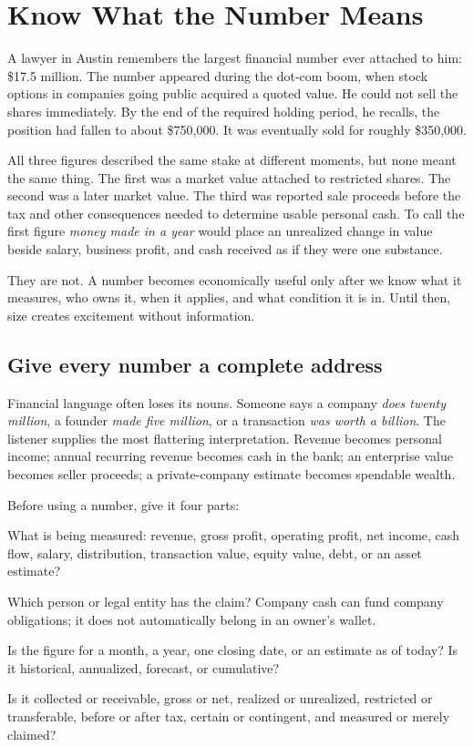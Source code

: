 \chapter{Know What the Number Means}

A lawyer in Austin remembers the largest financial number ever attached to
him: \$17.5 million. The number appeared during the dot-com boom, when stock
options in companies going public acquired a quoted value. He could not sell
the shares immediately. By the end of the required holding period, he recalls,
the position had fallen to about \$750,000. It was eventually sold for roughly
\$350,000.

All three figures described the same stake at different moments, but none meant
the same thing. The first was a market value attached to restricted shares. The
second was a later market value. The third was reported sale proceeds before
the tax and other consequences needed to determine usable personal cash. To
call the first figure \emph{money made in a year} would place an unrealized
change in value beside salary, business profit, and cash received as if they
were one substance.

They are not. A number becomes economically useful only after we know what it
measures, who owns it, when it applies, and what condition it is in. Until then,
size creates excitement without information.

\section{Give every number a complete address}

Financial language often loses its nouns. Someone says a company \emph{does
twenty million}, a founder \emph{made five million}, or a transaction \emph{was
worth a billion}. The listener supplies the most flattering interpretation.
Revenue becomes personal income; annual recurring revenue becomes cash in the
bank; an enterprise value becomes seller proceeds; a private-company estimate
becomes spendable wealth.

Before using a number, give it four parts:

\begin{description}[leftmargin=2.65em,style=nextline]
\item[Category] What is being measured: revenue, gross profit, operating
  profit, net income, cash flow, salary, distribution, transaction value,
  equity value, debt, or an asset estimate?
\item[Owner] Which person or legal entity has the claim? Company cash can fund
  company obligations; it does not automatically belong in an owner's wallet.
\item[Period] Is the figure for a month, a year, one closing date, or an
  estimate as of today? Is it historical, annualized, forecast, or cumulative?
\item[State] Is it collected or receivable, gross or net, realized or
  unrealized, restricted or transferable, before or after tax, certain or
  contingent, and measured or merely claimed?
\end{description}

